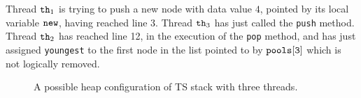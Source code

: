 Thread ${\tt th}_1$ is trying to push a new node with data value $4$, pointed by its local variable $\tt new$, having reached line 3.
Thread ${\tt th}_3$ has just called the {\tt push} method.
Thread ${\tt th}_2$ has reached line 12, in the execution of the {\tt pop} method,  and has just assigned {\tt youngest} to the first node in the list
pointed to by $\tt pools[3]$ which is not logically removed.

\begin{figure}
	
\caption{A possible heap configuration of TS stack with three threads.}
\label{fig:tsshape}
\end{figure} 
%	


